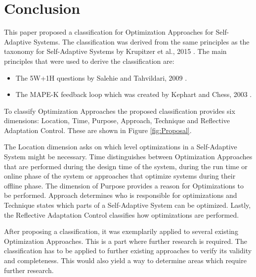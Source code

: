 \newpage
\section{Conclusion}
\label{ch:Conclusion}


This paper proposed a classification for Optimization Approaches for Self-Adaptive Systems.
The classification was derived from the same principles as the taxonomy for Self-Adaptive Systems
by Krupitzer et al., 2015 \cite*{SurveyOnEngineeringApproaches}.
The main principles that were used to derive the classification are:
\begin{itemize}
    \item The 5W+1H questions by Salehie and Tahvildari, 2009 \cite*{LandscapeAndResearchChallenges}.
    \item The MAPE-K feedback loop which was created by Kephart and Chess, 2003 \cite*{VisionOfAutonomicComputing}.
\end{itemize}

To classify Optimization Approaches the proposed classification provides six dimensions:
Location, Time, Purpose, Approach, Technique and Reflective Adaptation Control.
These are shown in Figure \ref{fig:Proposal}.

The Location dimension asks on which level optimizations in a Self-Adaptive System might be necessary.
Time distinguishes between Optimization Approaches that are performed during the design time of the system,
during the run time or online phase of the system or approaches that optimize systems during their offline phase.
The dimension of Purpose provides a reason for Optimizations to be performed.
Approach determines who is responsible for optimizations
and Technique states which parts of a Self-Adaptive System can be optimized.
Lastly, the Reflective Adaptation Control classifies how optimizations are performed.
\newline
\par


After proposing a classification, it was exemplarily applied to several existing Optimization Approaches.
This is a part where further research is required. 
The classification has to be applied to further existing approaches to verify its validity and completeness.
This would also yield a way to determine areas which require further research.

